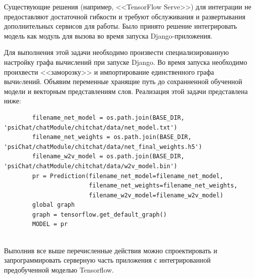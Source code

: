 Существующие решения (например, <<TensorFlow Serve>>) для интеграции не предоставляют достаточной гибкости и требуют обслуживания и развертывания дополнительных сервисов для работы. Было принято решение интегрировать модель как модуль для вызова во время запуска Django-приложения. 

Для выполнения этой задачи необходимо произвести специализированную настройку графа вычислений при запуске Django. Во время запуска необходимо проихвести <<заморозку>> и импортирование единственного графа вычиcлений. Объявим переменные хранящие путь до сохранненной обученной модели и векторным представлениям слов. Реализация этой задачи представлена ниже: 

\begin{minipage}{0.9\textwidth}
        \begin{verbatim}
        filename_net_model = os.path.join(BASE_DIR, 'psiChat/chatModule/chitchat/data/net_model.txt')
        filename_net_weights = os.path.join(BASE_DIR, 'psiChat/chatModule/chitchat/data/net_final_weights.h5')
        filename_w2v_model = os.path.join(BASE_DIR, 'psiChat/chatModule/chitchat/data/w2v_model.bin')
        pr = Prediction(filename_net_model=filename_net_model,
                        filename_net_weights=filename_net_weights,
                        filename_w2v_model=filename_w2v_model)
        global graph
        graph = tensorflow.get_default_graph()
        MODEL = pr
        \end{verbatim}
\end{minipage}\\[1.5pt]

Выполнив все выше перечисленные действия можно спроектировать и запрограммировать серверную часть приложения с интегрированной предобученной моделью Tensorflow.


